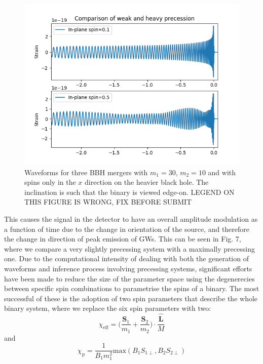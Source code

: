 \documentclass[11pt]{article}
\begin{document}
\begin{figure}[H]
	\includegraphics[scale=0.8]{fig7.png}
	\centering
	\caption{Waveforms for three BBH mergers with $m_1=30$, $m_2=10$ and with spins only in the $x$ direction on the heavier black hole. The inclination is such that the binary is viewed edge-on. LEGEND ON THIS FIGURE IS WRONG, FIX BEFORE SUBMIT}
	\centering
\end{figure}
This causes the signal in the detector to have an overall amplitude modulation as a function of time due to the change in orientation of the source, and therefore the change in direction of peak emission of GWs. This can be seen in Fig. 7, where we compare a very slightly precessing system with a maximally precessing one.
Due to the computational intensity of dealing with both the generation of waveforms and inference process involving precessing systems, significant efforts have been made to reduce the size of the parameter space using the degenerecies between specific spin combinations to parametrise the spins of a binary. The most successful of these is the adoption of two spin parameters\cite{imr}\cite{chip} that describe the whole binary system, where we replace the six spin parameters with two:
\begin{equation}
\chi_{\text{eff}}=\bigg(\frac{\mathbf{S}_1}{m_1}+\frac{\mathbf{S}_2}{m_2}\bigg)\cdot\frac{\mathbf{\hat{L}}}{M}
\end{equation}
and
\begin{equation}
\chi_\text{p}=\frac{1}{B_1m^2_1}\text{max}(B_1S_{1\perp},B_2S_{2\perp})
\end{equation}
\end{document}
